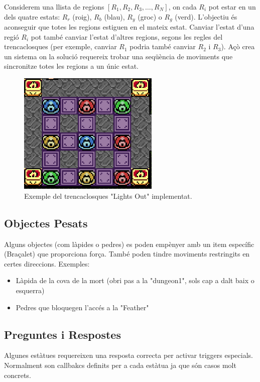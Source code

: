 \documentclass[a4paper,12pt]{article}
\begin{document}
Considerem una llista de regions $[R_1, R_2, R_3, \ldots, R_N]$, on cada $R_i$ pot estar en un dels quatre estats: $R_r$ (roig), $R_b$ (blau), $R_y$ (groc) o $R_g$ (verd). L'objectiu és aconseguir que totes les regions estiguen en el mateix estat. Canviar l'estat d'una regió $R_i$ pot també canviar l'estat d'altres regions, segons les regles del trencaclosques (per exemple, canviar $R_1$ podria també canviar $R_2$ i $R_3$). Açò crea un sistema on la solució requereix trobar una seqüència de moviments que sincronitze totes les regions a un únic estat.

\begin{figure}[ht!]
    \centering
    \includegraphics[width=0.6\textwidth]{../imgs/exemple-trencaclosques.png}
    \caption{Exemple del trencaclosques "Lights Out" implementat.}
    \label{fig:exemple-trencaclosques}
\end{figure}

\subsection{Objectes Pesats}
Alguns objectes (com làpides o pedres) es poden empènyer amb un item específic (Braçalet) que proporciona força. També poden tindre moviments restringits en certes direccions. Exemples:
\begin{itemize}
    \item Làpida de la cova de la mort (obri pas a la "dungeon1", sols cap a dalt baix o esquerra)
    \item Pedres que bloquegen l'accés a la "Feather"
\end{itemize}

\subsection{Preguntes i Respostes}
Algunes estàtues requereixen una resposta correcta per activar triggers especials.
Normalment son callbakcs definits per a cada estàtua ja que són casos molt concrets.
\end{document}
